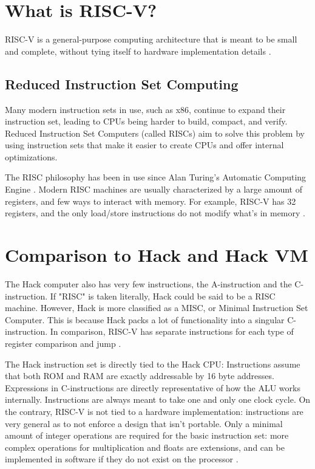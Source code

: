 \maketitle

\section{What is RISC-V?}

RISC-V is a general-purpose computing architecture that is meant to be small and
complete, without tying itself to hardware implementation details
\cite{waterman2019risc}.

\subsection{Reduced Instruction Set Computing}

Many modern instruction sets in use, such as x86, continue to expand their
instruction set, leading to CPUs being harder to build, compact, and verify.
Reduced Instruction Set Computers (called RISCs) aim to solve this problem
by using instruction sets that make it easier to create CPUs and offer internal
optimizations.

The RISC philosophy has been in use since Alan Turing's Automatic Computing
Engine \cite{doran2005computer}. Modern RISC machines are usually characterized
by a large amount of registers, and few ways to interact with memory. For
example, RISC-V has 32 registers, and the only load/store instructions do not
modify what's in memory \cite{waterman2019risc}.

\section{Comparison to Hack and Hack VM}

The Hack computer also has very few instructions, the A-instruction and the
C-instruction. If "RISC" is taken literally, Hack could be said to be a RISC
machine. However, Hack is more classified as a MISC, or Minimal Instruction Set
Computer. This is because Hack packs a lot of functionality into a singular
C-instruction. In comparison, RISC-V has separate instructions for each type of
register comparison and jump \cite{waterman2019risc}.

The Hack instruction set is directly tied to the Hack CPU: Instructions assume
that both ROM and RAM are exactly addressable by 16 byte addresses. Expressions
in C-instructions are directly representative of how the ALU works internally.
Instructions are always meant to take one and only one clock cycle. On the
contrary, RISC-V is not tied to a hardware implementation: instructions are
very general as to not enforce a design that isn't portable. Only a minimal
amount of integer operations are required for the basic instruction set: more
complex operations for multiplication and floats are extensions, and can be
implemented in software if they do not exist on the processor
\cite{waterman2019risc}.

